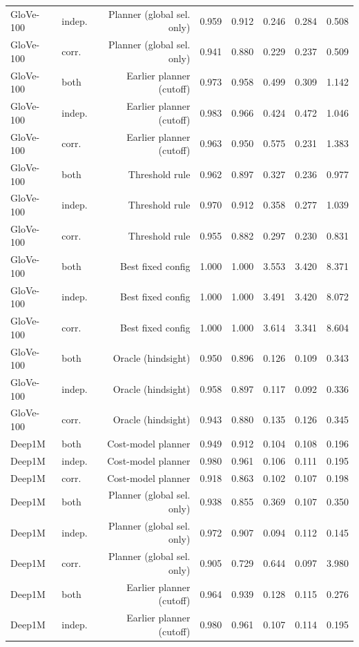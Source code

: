 \begin{table}[t]
\begin{tabular}{llrrrrrr}
GloVe-100 & indep. & Planner (global sel. only) & 0.959 & 0.912 & 0.246 & 0.284 & 0.508 \\
GloVe-100 & corr. & Planner (global sel. only) & 0.941 & 0.880 & 0.229 & 0.237 & 0.509 \\
GloVe-100 & both & Earlier planner (cutoff) & 0.973 & 0.958 & 0.499 & 0.309 & 1.142 \\
GloVe-100 & indep. & Earlier planner (cutoff) & 0.983 & 0.966 & 0.424 & 0.472 & 1.046 \\
GloVe-100 & corr. & Earlier planner (cutoff) & 0.963 & 0.950 & 0.575 & 0.231 & 1.383 \\
GloVe-100 & both & Threshold rule & 0.962 & 0.897 & 0.327 & 0.236 & 0.977 \\
GloVe-100 & indep. & Threshold rule & 0.970 & 0.912 & 0.358 & 0.277 & 1.039 \\
GloVe-100 & corr. & Threshold rule & 0.955 & 0.882 & 0.297 & 0.230 & 0.831 \\
GloVe-100 & both & Best fixed config & 1.000 & 1.000 & 3.553 & 3.420 & 8.371 \\
GloVe-100 & indep. & Best fixed config & 1.000 & 1.000 & 3.491 & 3.420 & 8.072 \\
GloVe-100 & corr. & Best fixed config & 1.000 & 1.000 & 3.614 & 3.341 & 8.604 \\
GloVe-100 & both & Oracle (hindsight) & 0.950 & 0.896 & 0.126 & 0.109 & 0.343 \\
GloVe-100 & indep. & Oracle (hindsight) & 0.958 & 0.897 & 0.117 & 0.092 & 0.336 \\
GloVe-100 & corr. & Oracle (hindsight) & 0.943 & 0.880 & 0.135 & 0.126 & 0.345 \\
Deep1M & both & Cost-model planner & 0.949 & 0.912 & 0.104 & 0.108 & 0.196 \\
Deep1M & indep. & Cost-model planner & 0.980 & 0.961 & 0.106 & 0.111 & 0.195 \\
Deep1M & corr. & Cost-model planner & 0.918 & 0.863 & 0.102 & 0.107 & 0.198 \\
Deep1M & both & Planner (global sel. only) & 0.938 & 0.855 & 0.369 & 0.107 & 0.350 \\
Deep1M & indep. & Planner (global sel. only) & 0.972 & 0.907 & 0.094 & 0.112 & 0.145 \\
Deep1M & corr. & Planner (global sel. only) & 0.905 & 0.729 & 0.644 & 0.097 & 3.980 \\
Deep1M & both & Earlier planner (cutoff) & 0.964 & 0.939 & 0.128 & 0.115 & 0.276 \\
Deep1M & indep. & Earlier planner (cutoff) & 0.980 & 0.961 & 0.107 & 0.114 & 0.195 \\

\end{tabular}
\end{table}
